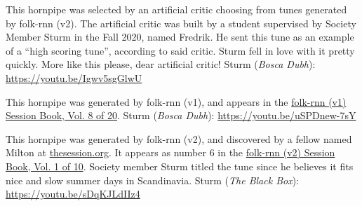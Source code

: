 \documentclass[a4paper,notitlepage,twoside]{book}
\begin{document}
{}\label{hornpipe:FredriksChristmasCritic}
\hypertarget{hornpipe:FredriksChristmasCritic}{}
This hornpipe was selected by an artificial critic choosing from tunes generated by folk-rnn (v2). The artificial critic was built by a student supervised by Society Member Sturm in the Fall 2020, named Fredrik. He sent  this tune as an example of a ``high scoring tune'', according to said critic. Sturm fell in love with it pretty quickly. More like this please, dear artificial critic! Sturm ({\em Bosca Dubh}): \url{https://youtu.be/Igwv5sgGlwU}

{}  
  
\hypertarget{hornpipe:SorpikesCat}{}
This hornpipe was generated by folk-rnn (v1), and
appears in the \href{https://highnoongmt.wordpress.com/2018/01/05/volumes-1-20-of-folk-rnn-v1-transcriptions}{folk-rnn (v1) Session Book, Vol. 8 of 20}.
Sturm ({\em Bosca Dubh}): \url{https://youtu.be/uSPDnew-7sY}

{}  
  
\hypertarget{hornpipe:SocksandSandals}{}
This hornpipe was generated by folk-rnn (v2), and
discovered by a fellow named Milton at \href{https://thesession.org/discussions/40416}{thesession.org}.
It appears as number 6 in the \href{https://highnoongmt.wordpress.com/2018/01/05/volumes-1-20-of-folk-rnn-v1-transcriptions}{folk-rnn (v2) Session Book, Vol. 1 of 10}.
Society member Sturm titled the tune since he believes it fits
nice and slow summer days in Scandinavia.
Sturm ({\em The Black Box}): \url{https://youtu.be/sDqKJLdIIz4}

\clearpage
\end{document}
